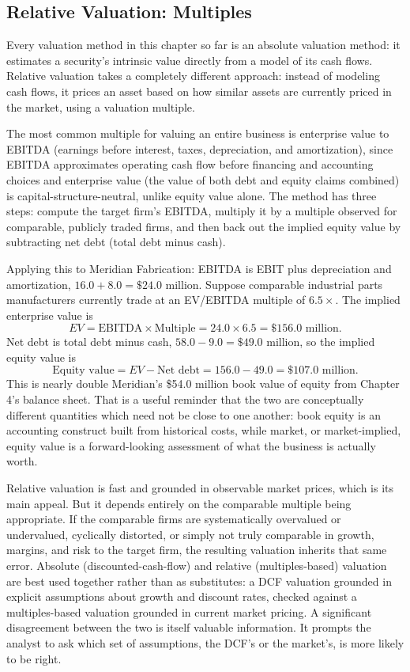 \documentclass[../ai_in_finance]{subfiles}
\begin{document}
\subsection{Relative Valuation: Multiples}

Every valuation method in this chapter so far is an absolute valuation method: it estimates a security's intrinsic value directly from a model of its cash flows. Relative valuation takes a completely different approach: instead of modeling cash flows, it prices an asset based on how similar assets are currently priced in the market, using a valuation multiple.

The most common multiple for valuing an entire business is enterprise value to EBITDA (earnings before interest, taxes, depreciation, and amortization), since EBITDA approximates operating cash flow before financing and accounting choices and enterprise value (the value of both debt and equity claims combined) is capital-structure-neutral, unlike equity value alone. The method has three steps: compute the target firm's EBITDA, multiply it by a multiple observed for comparable, publicly traded firms, and then back out the implied equity value by subtracting net debt (total debt minus cash).

Applying this to Meridian Fabrication: EBITDA is EBIT plus depreciation and amortization, $16.0 + 8.0 = \$24.0$ million. Suppose comparable industrial parts manufacturers currently trade at an EV/EBITDA multiple of $6.5\times$. The implied enterprise value is
\begin{equation*}
EV = \text{EBITDA} \times \text{Multiple} = 24.0 \times 6.5 = \$156.0 \text{ million}.
\end{equation*}
Net debt is total debt minus cash, $58.0 - 9.0 = \$49.0$ million, so the implied equity value is
\begin{equation*}
\text{Equity value} = EV - \text{Net debt} = 156.0 - 49.0 = \$107.0 \text{ million}.
\end{equation*}
This is nearly double Meridian's \$54.0 million book value of equity from Chapter 4's balance sheet. That is a useful reminder that the two are conceptually different quantities which need not be close to one another: book equity is an accounting construct built from historical costs, while market, or market-implied, equity value is a forward-looking assessment of what the business is actually worth.

Relative valuation is fast and grounded in observable market prices, which is its main appeal. But it depends entirely on the comparable multiple being appropriate. If the comparable firms are systematically overvalued or undervalued, cyclically distorted, or simply not truly comparable in growth, margins, and risk to the target firm, the resulting valuation inherits that same error. Absolute (discounted-cash-flow) and relative (multiples-based) valuation are best used together rather than as substitutes: a DCF valuation grounded in explicit assumptions about growth and discount rates, checked against a multiples-based valuation grounded in current market pricing. A significant disagreement between the two is itself valuable information. It prompts the analyst to ask which set of assumptions, the DCF's or the market's, is more likely to be right.
\end{document}
